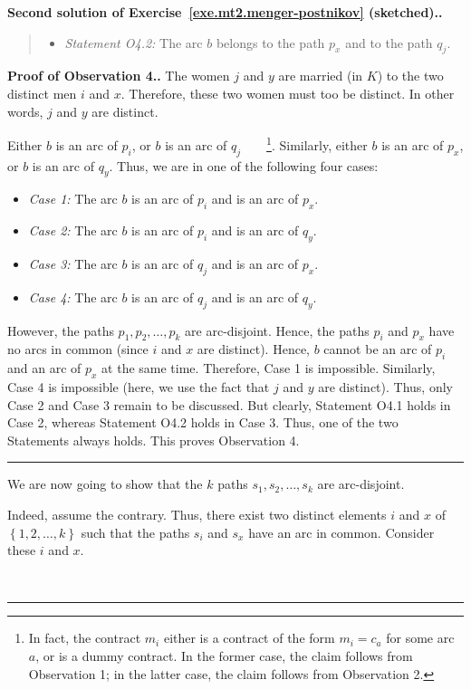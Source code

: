 \documentclass[numbers=enddot,12pt,final,onecolumn,notitlepage]{scrartcl}%
\theoremstyle{definition}
\newenvironment{statement}{\begin{quote}}{\end{quote}}
\newenvironment{proof}[1][Proof]{\noindent\textbf{#1.} }{\ \rule{0.5em}{0.5em}}
\newcommand{\set}[1]{\left\{ #1 \right\}}
\begin{document}
\begin{proof}[Second solution of
Exercise~\ref{exe.mt2.menger-postnikov} (sketched).]
\begin{statement}
\begin{itemize}
\item \textit{Statement O4.2:}
   The arc $b$ belongs to the path $p_x$ and to the
   path $q_j$.
\end{itemize}

\end{statement}

\begin{proof}[Proof of Observation 4.]
The women $j$ and $y$ are married (in $K$) to the two distinct
men $i$ and $x$.
Therefore, these two women must too be distinct.
In other words, $j$ and $y$ are distinct.

Either $b$ is an arc of $p_i$, or $b$ is an arc of
$q_j$\ \ \ \ \footnote{In fact, the contract $m_i$ either
  is a contract of the form $m_i = c_a$ for some arc $a$,
  or is a dummy contract.
  In the former case, the claim follows from Observation 1;
  in the latter case, the claim follows from Observation 2.}.
Similarly, either $b$ is an arc of $p_x$, or $b$ is an arc
of $q_y$.
Thus, we are in one of the following four cases:

\begin{itemize}
 \item \textit{Case 1:} The arc $b$ is an arc of $p_i$ and is an
       arc of $p_x$.
 \item \textit{Case 2:} The arc $b$ is an arc of $p_i$ and is an
       arc of $q_y$.
 \item \textit{Case 3:} The arc $b$ is an arc of $q_j$ and is an
       arc of $p_x$.
 \item \textit{Case 4:} The arc $b$ is an arc of $q_j$ and is an
       arc of $q_y$.
\end{itemize}

However, the paths $p_1, p_2, \ldots, p_k$ are arc-disjoint.
Hence, the paths $p_i$ and $p_x$ have no arcs in common (since
$i$ and $x$ are distinct).
Hence, $b$ cannot be an arc of $p_i$ and an arc of $p_x$ at the
same time.
Therefore, Case 1 is impossible.
Similarly, Case 4 is impossible (here, we use the fact that $j$
and $y$ are distinct).
Thus, only Case 2 and Case 3 remain to be discussed.
But clearly, Statement O4.1 holds in Case 2, whereas
Statement O4.2 holds in Case 3.
Thus, one of the two Statements always holds.
This proves Observation 4.
\end{proof}

We are now going to show that the $k$ paths
$s_1, s_2, \ldots, s_k$ are arc-disjoint.

Indeed, assume the contrary.
Thus, there exist two distinct elements $i$ and $x$ of
$\set{1, 2, \ldots, k}$ such that the paths $s_i$ and $s_x$ have
an arc in common.
Consider these $i$ and $x$.


\end{proof}
\end{document}

